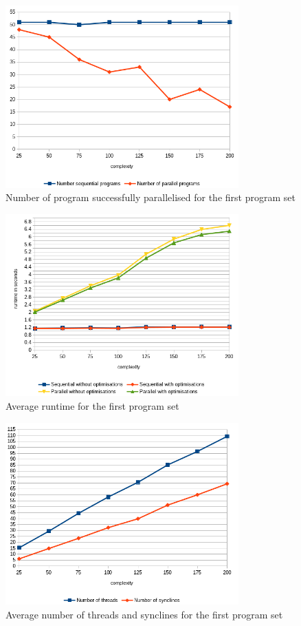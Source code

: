 \begin{figure}
    \centering
    \includegraphics[width=0.8\textwidth]{img/generated/par-success-1.png}
    \caption{\label{fig:gen-par-success-1}Number of program successfully parallelised for the first program set}
\end{figure}
\begin{figure}
    \centering
    \includegraphics[width=0.8\textwidth]{img/generated/avg-runtime-1.png}
    \caption{\label{fig:gen-avg-runtime-1}Average runtime for the first program set}
\end{figure}
\begin{figure}
    \centering
    \includegraphics[width=0.8\textwidth]{img/generated/thread-count-1.png}
    \caption{\label{fig:gen-thread-count-1}Average number of threads and synclines for the first program set}
\end{figure}

